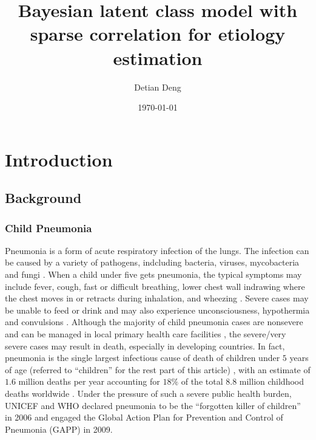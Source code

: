 \documentclass[11 pt, a4paper]{article}  %
\begin{document}
\title{Bayesian latent class model with sparse correlation for etiology estimation}   %
\author{Detian Deng}         %
\date{\today}    %
\maketitle

\section{Introduction}
\subsection{Background}
\subsubsection{Child Pneumonia}
Pneumonia is a form of acute respiratory infection of the lungs\cite{WHO}. The infection can be caused by a variety of pathogens, indcluding bacteria, viruses, mycobacteria and fungi \cite{hirama2011prediction}. When a child under five gets pneumonia, the typical symptoms may include fever, cough, fast or difficult breathing, lower chest wall indrawing where the chest moves in or retracts during inhalation, and wheezing \cite{singh2011pneumonia, WHO}. Severe cases may be unable to feed or drink and may also experience unconsciousness, hypothermia and convulsions \cite{WHO}. Although the majority of child pneumonia cases are nonsevere and can be managed in local primary health care facilities \cite{levine2012pneumonia}, the severe/very severe cases may result in death, especially in developing countries. In fact, pneumonia is the single largest infectious cause of death of children under $5$ years of age (referred to ``children'' for the rest part of this article) , with an estimate of $1.6$ million deaths per year accounting for $18\%$ of the total $8.8$ million childhood deaths worldwide \cite{liu2012global, black2010global}. Under the pressure of such a severe public health burden, UNICEF and WHO declared pneumonia to be the ``forgotten killer of children'' in 2006 \cite{unicef2006pneumonia} and engaged the Global Action Plan for Prevention and Control of Pneumonia (GAPP) \cite{world2009global} in 2009. \\
\end{document}
